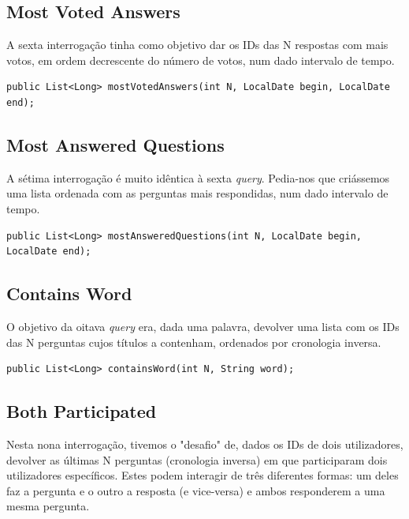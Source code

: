 \documentclass[a4paper, 11pt, oneside]{article}
\begin{document}
\subsection{Most Voted Answers}

A sexta interrogação tinha como objetivo dar os IDs das N respostas com mais votos, em ordem decrescente do número de votos, num dado intervalo de tempo.

\begin{lstlisting}
public List<Long> mostVotedAnswers(int N, LocalDate begin, LocalDate end);
\end{lstlisting}


\subsection{Most Answered Questions}
A sétima interrogação é muito idêntica à sexta \textit{query}. Pedia-nos que criássemos uma lista ordenada com as perguntas mais respondidas, num dado intervalo de tempo.

\begin{lstlisting}
public List<Long> mostAnsweredQuestions(int N, LocalDate begin, LocalDate end);
\end{lstlisting}



\subsection{Contains Word}

O objetivo da oitava \textit{query} era, dada uma palavra, devolver uma lista com os IDs das N perguntas cujos títulos a contenham, ordenados por cronologia inversa.

\begin{lstlisting}
public List<Long> containsWord(int N, String word);
\end{lstlisting}



\subsection{Both Participated}

Nesta nona interrogação, tivemos o "desafio" de, dados os IDs de dois utilizadores, devolver as últimas N perguntas (cronologia inversa) em que participaram dois 
utilizadores específicos. Estes podem interagir de três diferentes formas: um deles faz a pergunta e o outro a resposta (e vice-versa) e ambos responderem a uma mesma pergunta.
\end{document}
